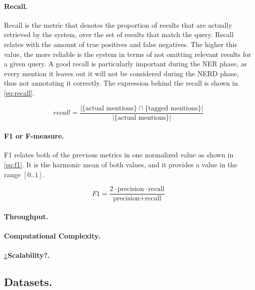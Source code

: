 \paragraph{Recall.}

Recall is the metric that denotes the proportion of results that are actually retrieved by the system, over the set of results that match the query. Recall relates with the amount of true positives and false negatives. The higher this value, the more reliable is the system in terms of not omitting relevant results for a given query. A good recall is particularly important during the NER phase, as every mention it leaves out it will not be considered during the NERD phase, thus not annotating it correctly. The expression behind the recall is shown in \autoref{eq:recall}.

\begin{equation}
recall = \frac{|\{\text{actual mentions}\} \cap \{\text{tagged mentions}\}|}{|\{\text{actual mentions}\}|}
\label{eq:recall}
\end{equation}

\paragraph{F1 or F-measure.}

F1 relates both of the previous metrics in one normalized value as shown in \autoref{eq:f1}. It is the harmonic mean of both values, and it provides a value in the range $[0..1]$.

\begin{equation}
F1 = \frac{2 \cdot \text{precision} \cdot \text{recall}}{\text{precision} + \text{recall}}
\label{eq:f1}
\end{equation}

\paragraph{Throughput.}

\paragraph{Computational Complexity.}

\paragraph{¿Scalability?.}



\subsection{Datasets.}


